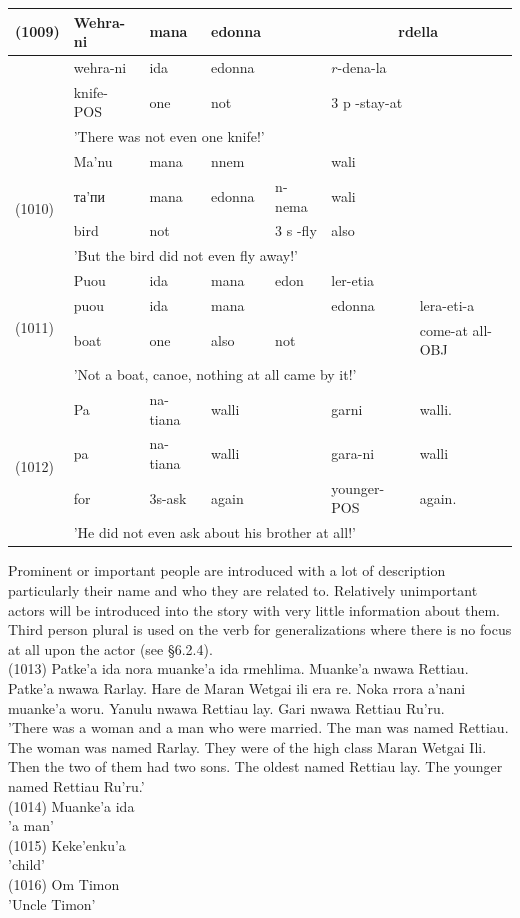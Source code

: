 \documentclass[10pt]{article}
\begin{document}
\begin{center}
\begin{tabular}{|l|l|l|l|l|l|l|}
\hline
\multirow[t]{4}{*}{(1009)} & Wehra-ni & mana & edonna &  & \multicolumn{2}{|c|}{rdella} \\
\hline
 & wehra-ni & ida & edonna &  & \(r\)-dena-la &  \\
\hline
 & knife-POS & one & not &  & 3 p -stay-at &  \\
\hline
 & \multicolumn{6}{|l|}{'There was not even one knife!'} \\
\hline
\multirow[t]{4}{*}{(1010)} & Ma'nu & mana & nnem &  & wali &  \\
\hline
 & та'пи & mana & edonna & n-nema & wali &  \\
\hline
 & bird & not &  & 3 s -fly & also &  \\
\hline
 & \multicolumn{6}{|l|}{'But the bird did not even fly away!'} \\
\hline
\multirow[t]{4}{*}{(1011)} & Puou & ida & mana & edon & ler-etia &  \\
\hline
 & puou & ida & mana &  & edonna & lera-eti-a \\
\hline
 & boat & one & also & not &  & come-at all-OBJ \\
\hline
 & \multicolumn{6}{|l|}{'Not a boat, canoe, nothing at all came by it!'} \\
\hline
\multirow[t]{4}{*}{(1012)} & Pa & na-tiana & walli &  & garni & walli. \\
\hline
 & pa & na-tiana & walli &  & gara-ni & walli \\
\hline
 & for & 3s-ask & again &  & younger-POS & again. \\
\hline
 & \multicolumn{6}{|l|}{'He did not even ask about his brother at all!'} \\
\hline
\end{tabular}
\end{center}

Prominent or important people are introduced with a lot of description particularly their name and who they are related to. Relatively unimportant actors will be introduced into the story with very little information about them. Third person plural is used on the verb for generalizations where there is no focus at all upon the actor (see §6.2.4).\\
(1013) Patke'a ida nora muanke'a ida rmehlima. Muanke'a nwawa Rettiau. Patke'a nwawa Rarlay. Hare de Maran Wetgai ili era re. Noka rrora a'nani muanke'a woru. Yanulu nwawa Rettiau lay. Gari nwawa Rettiau Ru'ru.\\
'There was a woman and a man who were married. The man was named Rettiau. The woman was named Rarlay. They were of the high class Maran Wetgai Ili. Then the two of them had two sons. The oldest named Rettiau lay. The younger named Rettiau Ru'ru.'\\
(1014) Muanke'a ida\\
'a man'\\
(1015) Keke'enku'a\\
'child'\\
(1016) Om Timon\\
'Uncle Timon'
\end{document}
